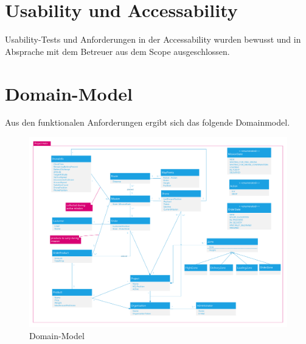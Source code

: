 \section{Usability und Accessability}

Usability-Tests und Anforderungen in der Accessability wurden bewusst und in Absprache mit dem Betreuer aus dem Scope ausgeschlossen.

\section{Domain-Model}
Aus den funktionalen Anforderungen ergibt sich das folgende Domainmodel.
\begin{landscape}
\begin{figure}[h]
	\includegraphics[width=0.75\paperheight]{images/domainmodell.pdf}
	\caption{Domain-Model}
	\label{fig:domain-model}
\end{figure}
\end{landscape}


